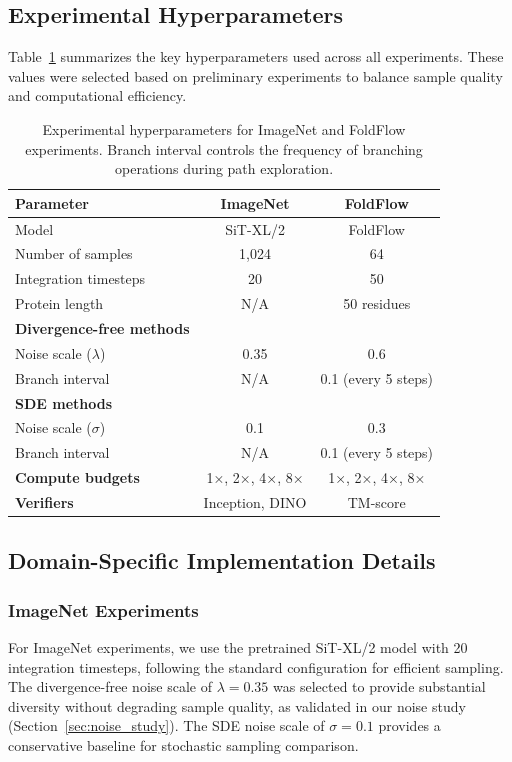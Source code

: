 \documentclass{article}
\begin{document}
\subsection{Experimental Hyperparameters}

Table~\ref{tab:hyperparameters} summarizes the key hyperparameters used across all experiments. These values were selected based on preliminary experiments to balance sample quality and computational efficiency.

\begin{table}[H]
\centering
\begin{tabular}{@{}lcc@{}}
\toprule
\textbf{Parameter} & \textbf{ImageNet} & \textbf{FoldFlow} \\
\midrule
Model & SiT-XL/2 & FoldFlow \\
Number of samples & 1,024 & 64 \\
Integration timesteps & 20 & 50 \\
Protein length & N/A & 50 residues \\
\midrule
\textbf{Divergence-free methods} & & \\
Noise scale ($\lambda$) & 0.35 & 0.6 \\
Branch interval & N/A & 0.1 (every 5 steps) \\
\midrule
\textbf{SDE methods} & & \\
Noise scale ($\sigma$) & 0.1 & 0.3 \\
Branch interval & N/A & 0.1 (every 5 steps) \\
\midrule
\textbf{Compute budgets} & 1×, 2×, 4×, 8× & 1×, 2×, 4×, 8× \\
\textbf{Verifiers} & Inception, DINO & TM-score \\
\bottomrule
\end{tabular}
\caption{Experimental hyperparameters for ImageNet and FoldFlow experiments. Branch interval controls the frequency of branching operations during path exploration.}
\label{tab:hyperparameters}
\end{table}

\subsection{Domain-Specific Implementation Details}

\subsubsection{ImageNet Experiments}

For ImageNet experiments, we use the pretrained SiT-XL/2 model with 20 integration timesteps, following the standard configuration for efficient sampling. The divergence-free noise scale of $\lambda = 0.35$ was selected to provide substantial diversity without degrading sample quality, as validated in our noise study (Section~\ref{sec:noise_study}). The SDE noise scale of $\sigma = 0.1$ provides a conservative baseline for stochastic sampling comparison.
\end{document}
